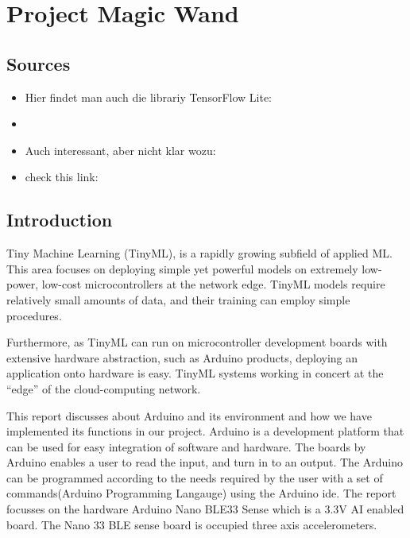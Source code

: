 %
%
%



\chapter{Project Magic Wand}

\section{Sources}




\begin{itemize}
    \item Hier findet man auch die librariy TensorFlow Lite: 
    \item {}
    \item Auch interessant, aber nicht klar wozu:
    \item check this link: 
\end{itemize}




\section{Introduction } 

Tiny Machine Learning (TinyML), is a rapidly growing subfield of applied ML. This area focuses on deploying simple yet powerful models on extremely low-power, low-cost microcontrollers at the network edge. TinyML models require relatively small amounts of data, and their training can employ simple procedures.

Furthermore, as TinyML can run on microcontroller development boards with extensive hardware abstraction, such as Arduino products, deploying an application onto hardware is easy. TinyML systems working in concert at the “edge” of the cloud-computing network.\cite{Reddi:2021}


This report discusses about Arduino and its environment and how we have implemented its functions in our project. Arduino is a development platform that can be used for easy integration of software and hardware. The boards by Arduino enables a user to read the input, and turn in to an output. The Arduino can be programmed according to the needs required by the user with a set of commands(Arduino Programming Langauge) using the Arduino \ac{ide}. \cite{Arduino:2021}
The report focusses on the hardware Arduino Nano BLE33 Sense which is a 3.3V AI enabled board. The Nano 33 BLE sense board is occupied three axis accelerometers. 

